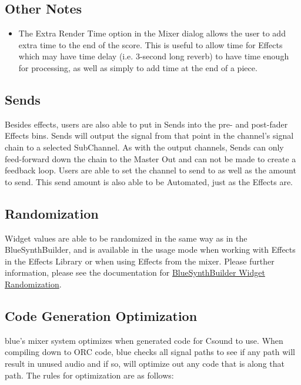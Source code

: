\subsection{Other Notes}

\begin{itemize}
\item
  The Extra Render Time option in the Mixer dialog allows the user to
  add extra time to the end of the score. This is useful to allow time
  for Effects which may have time delay (i.e. 3-second long reverb) to
  have time enough for processing, as well as simply to add time at the
  end of a piece.
\end{itemize}

\subsection{Sends}

Besides effects, users are also able to put in Sends into the pre- and
post-fader Effects bins. Sends will output the signal from that point in
the channel's signal chain to a selected SubChannel. As with the output
channels, Sends can only feed-forward down the chain to the Master Out
and can not be made to create a feedback loop. Users are able to set the
channel to send to as well as the amount to send. This send amount is
also able to be Automated, just as the Effects are.

\subsection{Randomization}

Widget values are able to be randomized in the same way as in the
BlueSynthBuilder, and is available in the usage mode when working with
Effects in the Effects Library or when using Effects from the mixer.
Please further information, please see the documentation for
\protect\hyperlink{bsbWidgetRandomization}{BlueSynthBuilder Widget
Randomization}.

\subsection{Code Generation Optimization}

blue's mixer system optimizes when generated code for Csound to use.
When compiling down to ORC code, blue checks all signal paths to see if
any path will result in unused audio and if so, will optimize out any
code that is along that path. The rules for optimization are as follows:

